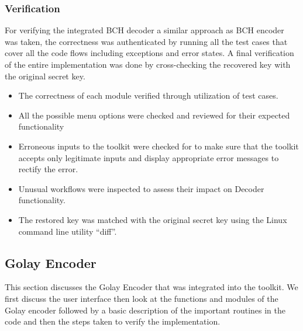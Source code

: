 	\subsubsection{Verification}
	For verifying the integrated BCH decoder a similar approach as BCH encoder was taken, the correctness was authenticated by running all the test cases that cover all the code flows including exceptions and error states. A final verification of the entire implementation was done by cross-checking the recovered key with the original secret key.


	\begin{itemize}
		\item The correctness of each module verified through utilization of test cases.
		\item All the possible menu options were checked and reviewed for their expected functionality
		\item Erroneous inputs to the toolkit were checked for to make sure that the toolkit accepts only legitimate inputs and display appropriate error messages to rectify the error.
		\item Unusual workflows were inspected to assess their impact on Decoder functionality.
		\item The restored key was matched with the original secret key using the Linux command line utility ``diff''.
	\end{itemize}

	\subsection{Golay Encoder}
	This section discusses the Golay Encoder that was integrated into the toolkit. We first discuss the user interface then look at the functions and modules of the Golay encoder followed by a basic description of the important routines in the code and then the steps taken to verify the implementation.\\

